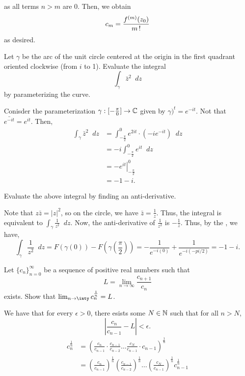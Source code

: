 \documentclass[11pt]{article}
\newcommand*\dif{\mathop{}\!d}
\begin{document}
as all terms $n > m$ are 0. Then, we obtain
\begin{equation*}
	c_m = \frac{f^{(m)}(z_0)}{m\operatorname{!}}
\end{equation*}
as desired.
\begin{exercise}
	Let $\gamma$ be the arc of the unit circle centered at the origin in the
	first quadrant oriented clockwise (from $i$ to 1). Evaluate the integral
	\begin{equation*}
		\int_\gamma\bar{z}^2\dif z
	\end{equation*}
	by parameterizing the curve.
\end{exercise}
Conisder the parameterization $\gamma:[-\frac{\pi}{0}]\to\mathbb{C}$ given by
$\gamma)^t=e^{-it}$. Not that $\bar{e^{-it}} = e^{it}$. Then,
\begin{align*}
	\int_\gamma\bar{z}^2\dif z
	&= \int^0_{-\frac{\pi}{2}}e^{2it}\cdot(-ie^{-it}) \dif z\\
	&= -i \int^0_{-\frac{\pi}{2}}e^{it} \dif z\\
	&= \left.-e^{it}\right|^0_{-\frac{\pi}{2}}\\
	&= -1-i.
\end{align*}
\begin{exercise}
	Evaluate the above integral by finding an anti-derivative.
\end{exercise}
Note that $z\bar z = |z|^2$, so on the circle, we have $\bar z = \frac{1}{z}$.
Thus, the integral is equivalent to $\int_{\gamma}\frac{1}{z^2}\dif z$. Now, the anti-derivative of $\frac{1}{z^2}$ is $-\frac{1}{z}$. Thus, by the , we have,
\begin{equation*}
    \int_{\gamma} \frac{1}{z^2}\dif z = F(\gamma(0))-F\left(\gamma\left(\frac{\pi}{2}\right)\right) = -\frac{1}{e^{-i(0)}}+\frac{1}{e^{-i(-pi / 2)}} = -1 -i.
\end{equation*}
\begin{exercise}
    Let $\{c_n\}^\infty_{n=0}$ be a sequence of positive real numbers such that
    \begin{equation*}
        L = \lim_{n \to \infty} \frac{c_{n+1}}{c_n}
    \end{equation*}
    exists. Show that $\lim_{n\to\inty} c_n^{\frac{1}{n}} = L$.
\end{exercise}
We have that for every $\epsilon > 0$, there esists some $N \in \mathbb{N}$ such that for all $n > N$,
\begin{equation*}
    \left| \frac{c_n}{c_{n-1}}-L \right| < \epsilon.
\end{equation*}
\begin{align*}
    c_n ^\frac{1}{n}
    &= \left(\frac{c_n}{c_{n-1}} \cdot \frac{c_{n-1}}{c_{n-2}} \hdots \frac{c_N}{c_{n-1}}\cdot c_{n-1} \right)^\frac{1}{n} \\
    &= \left(\frac{c_n}{c_{n-1}}\right)^\frac{1}{n} \left(\frac{c_{n-1}}{c_{n-2}} \right)^\frac{1}{n} \hdots \left(\frac{c_N}{c_{n-1}} \right)^\frac{1}{n} c_{n-1}^\frac{1}{n}
\end{align*}
\end{document}
